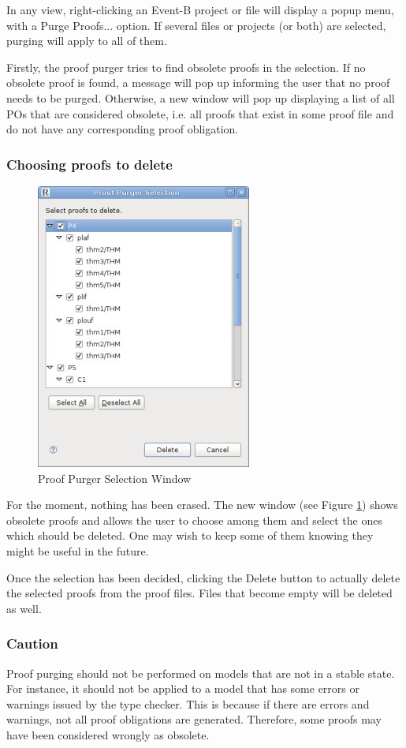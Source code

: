 In any view, right-clicking an Event-B project or file will display a popup menu, with a \textsf{Purge Proofs...} option. If several files or projects (or both) are selected, purging will apply to all of them.

Firstly, the proof purger tries to find obsolete proofs in the selection. If no obsolete proof is found, a message will pop up informing the user that no proof needs to be purged. Otherwise, a new window will pop up displaying a list of all POs that are considered obsolete, i.e. all proofs that exist in some proof file and do not have any corresponding proof obligation. 

\subsubsection{Choosing proofs to delete}

\begin{figure}[!h]
\begin{center}
	\includegraphics{img/reference/ref_10_proof_purger.png}
	\caption{Proof Purger Selection Window}
	\label{fig_ref_10_proof_purger}
\end{center}
\end{figure}

For the moment, nothing has been erased. The new window (see Figure \ref{fig_ref_10_proof_purger}) shows obsolete proofs and allows the user to choose among them and select the ones which should be deleted. One may wish to keep some of them knowing they might be useful in the future.

Once the selection has been decided, clicking the Delete button to actually delete the selected proofs from the proof files. Files that become empty will be deleted as well.

\subsubsection{Caution}

Proof purging should not be performed on models that are not in a stable state. For instance, it should not be applied to a model that has some errors or warnings issued by the type checker. This is because if there are errors and warnings, not all proof obligations are generated. Therefore, some proofs may have been considered wrongly as obsolete.
